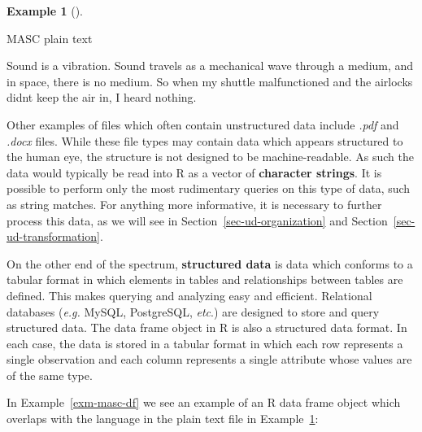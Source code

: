 \documentclass[
  letterpaper,
]{latex/krantz}
\newenvironment{Shaded}{\begin{snugshade}}{\end{snugshade}}
\newcommand{\NormalTok}[1]{\textcolor[rgb]{0.00,0.00,0.00}{#1}}
\theoremstyle{definition}
\newtheorem{example}{Example}[chapter]
\theoremstyle{remark}
\begin{document}
\begin{example}[]\protect\hypertarget{exm-masc-text}{}\label{exm-masc-text}

MASC plain text

\begin{Shaded}
\begin{Highlighting}[]
\NormalTok{Sound is a vibration. Sound travels as a mechanical wave through a medium, and in space, there is no medium. So when my shuttle malfunctioned and the airlocks didn\textquotesingle{}t keep the air in, I heard nothing.}
\end{Highlighting}
\end{Shaded}

\end{example}

Other examples of files which often contain unstructured data include
\emph{.pdf} and \emph{.docx} files. While these file types may contain
data which appears structured to the human eye, the structure is not
designed to be machine-readable. As such the data would typically be
read into R as a vector of \textbf{character strings}. It is possible to
perform only the most rudimentary queries on this type of data, such as
string matches. For anything more informative, it is necessary to
further process this data, as we will see in
Section~\ref{sec-ud-organization} and
Section~\ref{sec-ud-transformation}.

On the other end of the spectrum, \textbf{structured data} is data which
conforms to a tabular format in which elements in tables and
relationships between tables are defined. This makes querying and
analyzing easy and efficient. Relational databases (\emph{e.g.} MySQL,
PostgreSQL, \emph{etc}.) are designed to store and query structured
data. The data frame object in R is also a structured data format. In
each case, the data is stored in a tabular format in which each row
represents a single observation and each column represents a single
attribute whose values are of the same type.

In Example~\ref{exm-masc-df} we see an example of an R data frame object
which overlaps with the language in the plain text file in
Example~\ref{exm-masc-text}:
\end{document}
